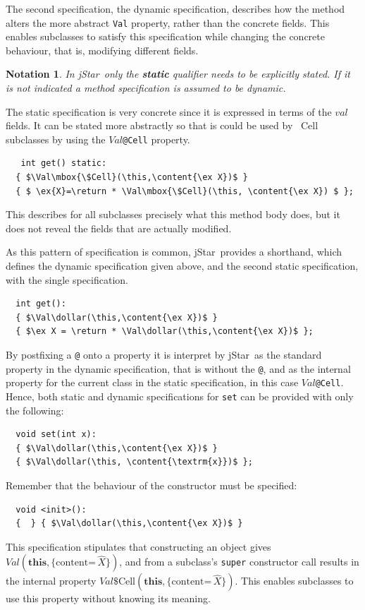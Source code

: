 \documentclass[11pt]{article}
\newcommand{\jStar}{{\sf jStar}}
\newcommand{\Val}{\mathit{Val}}
\newcommand{\ex}[1]{\mathord{\hat{#1}}}
\newcommand{\content}[1]{\{\text{content=} \, #1 \}}
\newcommand{\this}{\mathbf{this}}
\newcommand{\return}{\mathbf{return}}
\newcommand{\dollar}{\mbox{\$}}
\newtheorem{notation}{Notation}
\def\J{\lstinline}
\newcommand{\JS}[1]{$\mathit{#1}$}
\begin{document}
The second specification, the dynamic specification, describes how the
method alters the more abstract \J~Val~ property, rather than the
concrete fields.  This enables subclasses to satisfy this
specification while changing the concrete behaviour, that is,
modifying different fields.

\begin{notation}
In \jStar \ only the {\bf static}
  qualifier needs to be explicitly stated. If it is not indicated 
  a method specification is assumed to be dynamic.
  \end{notation}


The static specification is very concrete since it is expressed in terms of the 
$val$ fields.  It can be stated more abstractly so that is could be used by \JS~Cell~ 
subclasses  by using the \JS{Val}\J~@Cell~ property.
\begin{lstlisting}
   int get() static: 
  { $\Val\mbox{\$Cell}(\this,\content{\ex X})$ }
  { $ \ex{X}=\return * \Val\mbox{\$Cell}(\this, \content{\ex X}) $ };
\end{lstlisting}
This describes for all subclasses precisely what this method body
does, but it does not reveal the fields that are actually modified.

As this pattern of specification is common, \jStar \ provides a shorthand,
which defines the dynamic specification given above, and the second
static specification, with the single specification.
%
\begin{lstlisting}
  int get(): 
  { $\Val\dollar(\this,\content{\ex X})$ } 
  { $\ex X = \return * \Val\dollar(\this,\content{\ex X})$ };
\end{lstlisting}
By postfixing a \J~@~ onto a property it is interpret by \jStar \ as the
standard property in the dynamic specification, that is without the
\J~@~, and as the internal property for the current class in the
static specification, in this case \JS{Val}\J~@Cell~.
%
Hence, both static and dynamic specifications for \J~set~  can be provided with only the following: 
\begin{lstlisting}
  void set(int x): 
  { $\Val\dollar(\this,\content{\ex X})$ } 
  { $\Val\dollar(\this, \content{\textrm{x}})$ };
\end{lstlisting}
Remember that the behaviour of the constructor must be specified:
%
\begin{lstlisting}
  void <init>(): 
  {  } { $\Val\dollar(\this,\content{\ex X})$ }
\end{lstlisting}
This specification stipulates that constructing an object gives
$\Val(\this,\content{\ex X})$, and from a subclass's \J~super~
constructor call results in the internal property
$\Val\mbox{\$Cell}(\this,\content{\ex X})$.  This enables subclasses
to use this property without knowing its meaning.
\end{document}
